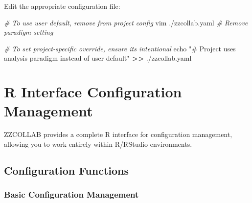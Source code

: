 \documentclass[
]{article}
\newenvironment{Shaded}{\begin{snugshade}}{\end{snugshade}}
\newcommand{\BuiltInTok}[1]{#1}
\newcommand{\CommentTok}[1]{\textcolor[rgb]{0.56,0.35,0.01}{\textit{#1}}}
\newcommand{\ExtensionTok}[1]{#1}
\newcommand{\NormalTok}[1]{#1}
\newcommand{\OperatorTok}[1]{\textcolor[rgb]{0.81,0.36,0.00}{\textbf{#1}}}
\newcommand{\StringTok}[1]{\textcolor[rgb]{0.31,0.60,0.02}{#1}}
\begin{document}
Edit the appropriate configuration file:

\begin{Shaded}
\begin{Highlighting}[]
\CommentTok{\# To use user default, remove from project config}
\ExtensionTok{vim}\NormalTok{ ./zzcollab.yaml  }\CommentTok{\# Remove paradigm setting}

\CommentTok{\# To set project{-}specific override, ensure it\textquotesingle{}s intentional}
\BuiltInTok{echo} \StringTok{"\# Project uses analysis paradigm instead of user default"} \OperatorTok{\textgreater{}\textgreater{}}\NormalTok{ ./zzcollab.yaml}
\end{Highlighting}
\end{Shaded}

\section{R Interface Configuration
Management}\label{r-interface-configuration-management}

ZZCOLLAB provides a complete R interface for configuration management,
allowing you to work entirely within R/RStudio environments.

\subsection{Configuration Functions}\label{configuration-functions}

\subsubsection{Basic Configuration
Management}\label{basic-configuration-management}
\end{document}
